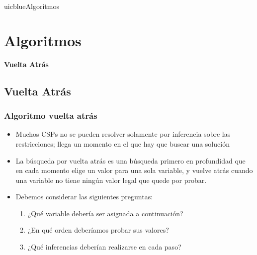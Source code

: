 \documentclass[xcolor=table]{beamer}
\begin{document}
\begin{chapter}{uicblue}{Algoritmos}
\end{chapter}
\section{Algoritmos}

\begin{frame}  \Large

\begin{center}
    \textbf{Vuelta Atrás}
\end{center}

\end{frame} 


\subsection{Vuelta Atrás}


\begin{frame}  \frametitle{Algoritmo vuelta atrás} \footnotesize

\begin{itemize}
\item Muchos CSPs no se pueden resolver solamente por inferencia sobre las restricciones; llega un momento en el que hay que buscar una solución
\item  La búsqueda por vuelta atrás es una búsqueda primero en profundidad que en cada momento elige un valor para una sola variable, y vuelve atrás cuando una variable no tiene ningún valor legal que quede por probar.

\item  Debemos considerar las siguientes preguntas:
\begin{enumerate}\footnotesize
\item ¿Qué variable debería ser asignada a continuación?
\item ¿En qué orden deberíamos probar sus valores?
\item ¿Qué inferencias deberían realizarse en cada paso?
\end{enumerate}

\end{itemize}


\end{frame} 
\end{document}
